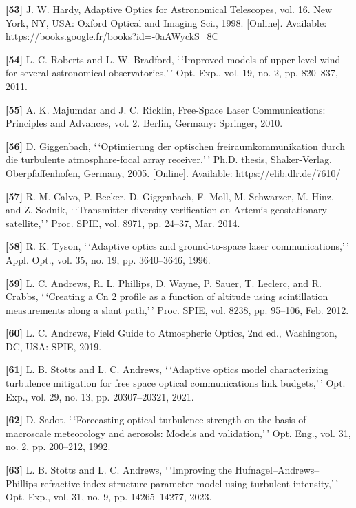 \documentclass[
]{article}
\begin{document}
\textbf{{[}53{]}} J. W. Hardy, Adaptive Optics for Astronomical
Telescopes, vol. 16. New York, NY, USA: Oxford Optical and Imaging Sci.,
1998. {[}Online{]}. Available:
https://books.google.fr/books?id=-0aAWyckS\_8C

\textbf{{[}54{]}} L. C. Roberts and L. W. Bradford, `\,`Improved models
of upper-level wind for several astronomical observatories,'\,' Opt.
Exp., vol. 19, no. 2, pp. 820--837, 2011.

\textbf{{[}55{]}} A. K. Majumdar and J. C. Ricklin, Free-Space Laser
Communications: Principles and Advances, vol. 2. Berlin, Germany:
Springer, 2010.

\textbf{{[}56{]}} D. Giggenbach, `\,`Optimierung der optischen
freiraumkommunikation durch die turbulente atmosphare-focal array
receiver,'\,' Ph.D. thesis, Shaker-Verlag, Oberpfaffenhofen, Germany,
2005. {[}Online{]}. Available: https://elib.dlr.de/7610/

\textbf{{[}57{]}} R. M. Calvo, P. Becker, D. Giggenbach, F. Moll, M.
Schwarzer, M. Hinz, and Z. Sodnik, `\,`Transmitter diversity
verification on Artemis geostationary satellite,'\,' Proc. SPIE, vol.
8971, pp. 24--37, Mar. 2014.

\textbf{{[}58{]}} R. K. Tyson, `\,`Adaptive optics and ground-to-space
laser communications,'\,' Appl. Opt., vol. 35, no. 19, pp. 3640--3646,
1996.

\textbf{{[}59{]}} L. C. Andrews, R. L. Phillips, D. Wayne, P. Sauer, T.
Leclerc, and R. Crabbs, `\,`Creating a Cn 2 profile as a function of
altitude using scintillation measurements along a slant path,'\,' Proc.
SPIE, vol. 8238, pp. 95--106, Feb. 2012.

\textbf{{[}60{]}} L. C. Andrews, Field Guide to Atmospheric Optics, 2nd
ed., Washington, DC, USA: SPIE, 2019.

\textbf{{[}61{]}} L. B. Stotts and L. C. Andrews, `\,`Adaptive optics
model characterizing turbulence mitigation for free space optical
communications link budgets,'\,' Opt. Exp., vol. 29, no. 13, pp.
20307--20321, 2021.

\textbf{{[}62{]}} D. Sadot, `\,`Forecasting optical turbulence strength
on the basis of macroscale meteorology and aerosols: Models and
validation,'\,' Opt. Eng., vol. 31, no. 2, pp. 200--212, 1992.

\textbf{{[}63{]}} L. B. Stotts and L. C. Andrews, `\,`Improving the
Hufnagel--Andrews-- Phillips refractive index structure parameter model
using turbulent intensity,'\,' Opt. Exp., vol. 31, no. 9, pp.
14265--14277, 2023.
\end{document}
